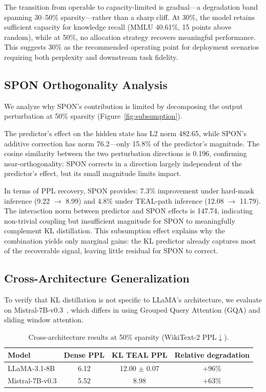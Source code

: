 The transition from operable to capacity-limited is gradual—a degradation band spanning 30--50\% sparsity—rather than a sharp cliff.
At 30\%, the model retains sufficient capacity for knowledge recall (MMLU 40.61\%, 15 points above random), while at 50\%, no allocation strategy recovers meaningful performance.
This suggests 30\% as the recommended operating point for deployment scenarios requiring both perplexity and downstream task fidelity.


\subsection{SPON Orthogonality Analysis}
\label{sec:spon}

We analyze why SPON's contribution is limited by decomposing the output perturbation at 50\% sparsity (Figure~\ref{fig:subsumption}).

The predictor's effect on the hidden state has L2 norm 482.65, while SPON's additive correction has norm 76.2—only 15.8\% of the predictor's magnitude. %
The cosine similarity between the two perturbation directions is 0.196, confirming near-orthogonality: SPON corrects in a direction largely independent of the predictor's effect, but its small magnitude limits impact.

In terms of PPL recovery, SPON provides: 7.3\% improvement under hard-mask inference (9.22 $\to$ 8.99) and 4.8\% under TEAL-path inference (12.08 $\to$ 11.79). %
The interaction norm between predictor and SPON effects is 147.74, indicating non-trivial coupling but insufficient magnitude for SPON to meaningfully complement KL distillation.
This subsumption effect explains why the combination yields only marginal gains: the KL predictor already captures most of the recoverable signal, leaving little residual for SPON to correct.


\subsection{Cross-Architecture Generalization}

To verify that KL distillation is not specific to LLaMA's architecture, we evaluate on Mistral-7B-v0.3~\cite{jiang2023mistral}, which differs in using Grouped Query Attention (GQA) and sliding window attention.

\begin{table}[t]
\centering
\caption{Cross-architecture results at 50\% sparsity (WikiText-2 PPL$\downarrow$).}
\label{tab:cross_arch}
\small
\begin{tabular}{lccc}
\toprule
Model & Dense PPL & KL TEAL PPL & Relative degradation \\
\midrule
LLaMA-3.1-8B & 6.12 & 12.00 $\pm$ 0.07 & +96\% \\ %
Mistral-7B-v0.3 & 5.52 & 8.98 & +63\% \\ %
\bottomrule
\end{tabular}
\end{table}

